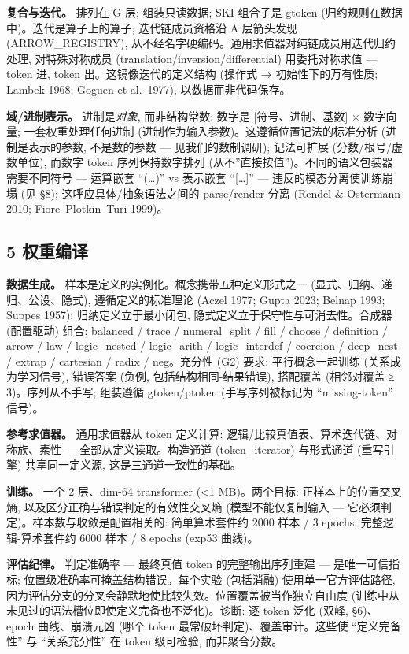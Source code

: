 \documentclass[
]{article}
\begin{document}
\textbf{复合与迭代。} 排列在 G 层; 组装只读数据; SKI 组合子是 gtoken
(归约规则在数据中)。迭代是算子上的算子; 迭代链成员资格沿 A 层箭头发现
(ARROW\_REGISTRY), 从不经名字硬编码。通用求值器对纯链成员用迭代归约处理,
对特殊对称成员 (translation/inversion/differential) 用委托对称求值 ---
token 进, token 出。这镜像迭代的定义结构 (操作式 → 初始性下的万有性质;
Lambek 1968; Goguen et al.~1977), 以数据而非代码保存。

\textbf{域/进制表示。} 进制是\emph{对象}, 而非结构常数: 数字是
{[}符号、进制、基数{]} × 数字向量; 一套权重处理任何进制
(进制作为输入参数)。这遵循位置记法的标准分析 (进制是表示的参数,
不是数的参数 --- 见我们的数制调研); 记法可扩展 (分数/根号/虚数单位),
而数字 token 序列保持数字排列
(从不''直接按值'')。不同的语义包装器需要不同符号 --- 运算嵌套
``(\ldots)'' vs 表示嵌套 ``{[}\ldots{]}'' --- 违反的模态分离使训练崩塌
(见 §8); 这呼应具体/抽象语法之间的 parse/render 分离 (Rendel \&
Ostermann 2010; Fiore--Plotkin--Turi 1999)。

\subsection{5 权重编译}\label{ux6743ux91cdux7f16ux8bd1}

\textbf{数据生成。} 样本是定义的实例化。概念携带五种定义形式之一
(显式、归纳、递归、公设、隐式), 遵循定义的标准理论 (Aczel 1977; Gupta
2023; Belnap 1993; Suppes 1957): 归纳定义立于最小闭包,
隐式定义立于保守性与可消去性。合成器 (配置驱动) 组合: balanced / trace /
numeral\_split / fill / choose / definition / arrow / law /
logic\_nested / logic\_arith / logic\_interdef / coercion / deep\_nest /
extrap / cartesian / radix / neg。充分性 (G2) 要求: 平行概念一起训练
(关系成为学习信号), 错误答案 (负例, 包括结构相同-结果错误), 搭配覆盖
(相邻对覆盖 ≥ 3)。序列从不手写; 组装遵循 gtoken/ptoken (手写序列被标记为
``missing-token'' 信号)。

\textbf{参考求值器。} 通用求值器从 token 定义计算:
逻辑/比较真值表、算术迭代链、对称族、素性 --- 全部从定义读取。构造通道
(token\_iterator) 与形式通道 (重写引擎) 共享同一定义源,
这是三通道一致性的基础。

\textbf{训练。} 一个 2 层、dim-64 transformer (\textless1 MB)。两个目标:
正样本上的位置交叉熵, 以及区分正确与错误判定的有效性交叉熵
(模型不能仅复制输入 --- 它必须判定)。样本数与收敛是配置相关的:
简单算术套件约 2000 样本 / 3 epochs; 完整逻辑-算术套件约 6000 样本 / 8
epochs (exp53 曲线)。

\textbf{评估纪律。} 判定准确率 --- 最终真值 token 的完整输出序列重建 ---
是唯一可信指标; 位置级准确率可掩盖结构错误。每个实验 (包括消融)
使用单一官方评估路径,
因为评估分支的分叉会静默地使比较失效。位置覆盖被当作独立自由度
(训练中从未见过的语法槽位即使定义完备也不泛化)。诊断: 逐 token 泛化
(双峰, §6)、epoch 曲线、崩溃元凶 (哪个 token
最常破坏判定)、覆盖审计。这些使 ``定义完备性'' 与 ``关系充分性'' 在
token 级可检验, 而非聚合分数。
\end{document}

